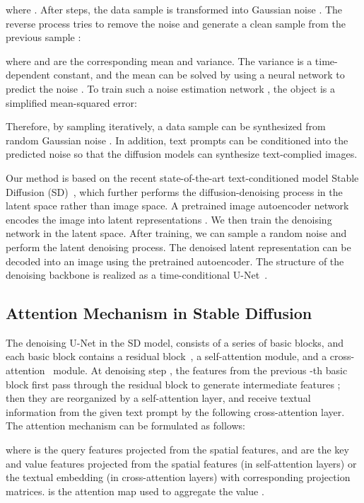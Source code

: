 \documentclass[10pt,twocolumn,letterpaper]{article}
\begin{document}
where . After  steps, the data sample  is transformed into Gaussian noise . The reverse process tries to remove the noise and generate a clean sample  from the previous sample :

where  and  are the corresponding mean and variance. The variance is a time-dependent constant, and the mean  can be solved by using a neural network  to predict the noise . To train such a noise estimation network , the object is a simplified mean-squared error:

Therefore, by sampling  iteratively, a data sample  can be synthesized from random Gaussian noise . In addition, text prompts  can be conditioned into the predicted noise  so that the diffusion models can synthesize text-complied images. 

Our method is based on the recent state-of-the-art text-conditioned model Stable Diffusion (SD)~\cite{rombach2022high}, which further performs the diffusion-denoising process in the latent space rather than image space. A pretrained image autoencoder network encodes the image into latent representations .
We then train the denoising network  in the latent space. After training, we can sample a random noise  and perform the latent denoising process. The denoised latent representation  can be decoded into an image using the pretrained autoencoder. The structure of the denoising backbone  is realized as a time-conditional U-Net~\cite{ronneberger2015unet}. 



\subsection{Attention Mechanism in Stable Diffusion}
The denoising U-Net  in the SD model, consists of a series of basic blocks, and each basic block contains a residual block~\cite{he2016deep}, a self-attention module, and a cross-attention~\cite{vaswani2017attention} module. At denoising step , the features from the previous -th basic block first pass through the residual block to generate intermediate features ; then they are reorganized by a self-attention layer, and receive textual information from the given text prompt  by the following cross-attention layer. The attention mechanism can be formulated as follows:

where  is the query features projected from the spatial features, and  are the key and value features projected from the spatial features (in self-attention layers) or the textual embedding (in cross-attention layers) with corresponding projection matrices.  is the attention map used to aggregate the value . 
\end{document}
